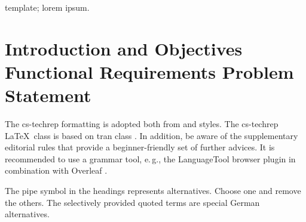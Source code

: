 \documentclass[conference,a4paper,flushend]{cs-techrep}
\begin{document}
\selectlanguage{\cstechrepLang}

\maketitle

\begin{abstract}
This paper demonstrates an example of a technical report in computer science or software engineering, based on the \texttt{cs-techrep} \LaTeX{} class.
The example is intended for beginners, e.\,g., undergraduate students.
It contains a basic outline template and usually fills it with dummy text, but some sections are describing the intent of the outline template and its sections.
Graphic exclamation marks highlight important remarks.
%
\{\,\faWarning{}The abstract does neither mention a thesis in which context a technical report is written nor an institution or any other organizational aspects.
It is a summary of the content of the technical report, thus, usually the objectives and architecture of a piece of software.
Do NOT remove the abstract, this section is mandatory.
Do NOT use special characters, symbols, or math in your title or abstract.
Do NOT use cites in your abstract.\}
\end{abstract}

\begin{IEEEkeywords}
template; lorem ipsum.
\end{IEEEkeywords}

\section{Introduction and Objectives \textbar{} Functional Requirements \textbar{} Problem Statement}

The cs-techrep formatting is adopted both from  \cite{ieee2018formattingrules} and  \cite{iaria2014formattingrules} styles.
The cs-techrep \LaTeX\ class is based on tran class \cite{ieee2015howto}.
In addition, be aware of the supplementary  editorial rules \cite{iaria2009editorialrules} \faWarning{} that provide a beginner-friendly set of further advices.
It is recommended to use a grammar tool, e.\,g., the LanguageTool \cite{languagetool} browser plugin in combination with Overleaf \cite{overleaf}.

The pipe symbol \textquote{\textbar{}} in the headings represents alternatives. Choose one and remove the others. The selectively provided quoted terms are special German alternatives.
\end{document}

